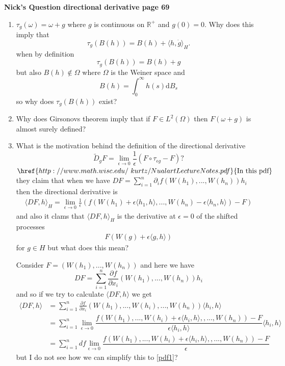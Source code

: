 \documentclass[a4paper,11pt]{article}
\numberwithin{equation}{section}
\theoremstyle{plain}
\theoremstyle{definition}
\newcommand{\ud}{\ensuremath{\mathrm{d}}}
\newcommand{\R}{\mathbb{R}}
\newcounter{NQ}
\newenvironment{NickQuestion}[1][] %
{\refstepcounter{NQ}
	\begin{mdframed}[backgroundcolor=lightgray]\textbf{Nick's Question \theNQ \: #1~~}~~~\noindent}%
	{\end{mdframed}}
\numberwithin{NQ}{section}
\numberwithin{LQ}{section}
\numberwithin{ZQ}{section}
\begin{document}
\begin{NickQuestion}[directional derivative page 69]
	\begin{enumerate}
\item $\tau_g(\omega) = \omega +g$ where $g$ is continuous on $\R^+$ and $g(0)=0$. Why does this imply that 
\[
	\tau_g(B(h))=B(h) + \langle h, \dot{g} \rangle_H. 
\]
when by definition 
\[
	\tau_g(B(h))=B(h) + g
\]
but also $B(h) \not \in \Omega$ where $\Omega$ is the Weiner space and 
\[
B(h)=\int_0^\infty h(s)\ud B_s
\] 
so why does $\tau_g(B(h))$ exist?

\item Why does Girsonovs theorem imply that if $F \in L^2(\Omega)$ then $F(\omega +g)$ is almost surely defined? 

\item What is the motivation behind the definition of the directional derivative 
\[ 
	\tilde{D}_gF = \lim_{\epsilon \to 0} \dfrac{1}{\epsilon}(F \circ \tau_{\epsilon g} -F)?
\]
$\href{http://www.math.wisc.edu/~kurtz/NualartLectureNotes.pdf}{\text{In this pdf}}$ they claim that when we have $DF = \sum_{i=1}^n\partial_i f(W(h_1),...,W(h_n))h_i$ then the directional derivative is 
\begin{align} \label{pdf1}
\langle DF, h \rangle_H = \lim_{\epsilon \to 0}\frac{1}{\epsilon}(f(W(h_1)+\epsilon\langle h_1,h \rangle,...,W(h_n)-\epsilon \langle h_n,h \rangle)-F)
\end{align}
and also it clams that $\langle DF, h \rangle_H $ is the derivative at $\epsilon=0$ of the shifted processes 
\begin{align} \label{pdf2}
F(W(g)+\epsilon \langle g,h\rangle )
\end{align}
for $g\in H$ but what does this mean?

Consider $F=(W(h_1),...,W(h_n))$ and here we have 
\[
DF =\sum_{i=1}^n \frac{\partial f}{\partial x_i}(W(h_1),...,W(h_n))h_i
\]
and so if we try to calculate $\langle DF ,h \rangle$ we get 
\begin{align} \label{ddiv}
	\langle DF ,h \rangle &=  \sum_{i=1}^n\frac{\partial f}{\partial x_i}(W(h_1),...,W(h_i),...,W(h_n))\langle h_i, h \rangle   
	\\&= \sum_{i=1}^n\lim_{\epsilon \to 0} \dfrac{f(W(h_1),...,W(h_i)+\epsilon \langle h_i ,h \rangle, ,...,W(h_n))-F}{\epsilon \langle h_i, h \rangle } \langle h_i , h \rangle \nonumber
	\\& = \sum_{i=1}^n df\lim_{\epsilon \to 0} \dfrac{f(W(h_1),...,W(h_i)+\epsilon \langle h_i ,h \rangle, ,...,W(h_n))-F}{\epsilon } \nonumber
\end{align}
but I do not see how we can simplify this to \eqref{pdf1}? 

	\end{enumerate}
\end{NickQuestion}
\end{document}

